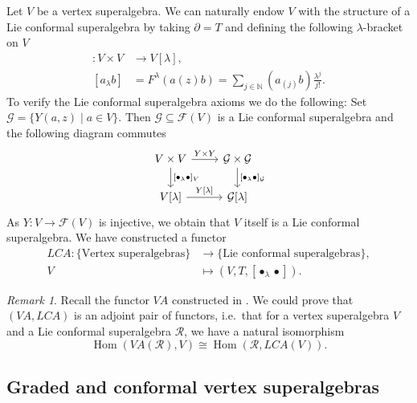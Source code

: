 \documentclass[a4paper, 12pt, reqno]{amsart}
\theoremstyle{remark}
\newtheorem{remark}[theorem]{Remark}
\numberwithin{equation}{subsection}
\DeclareMathOperator{\Hom}{Hom}
\begin{document}
Let $V$ be a vertex superalgebra.
We can naturally endow $V$ with the structure of a Lie conformal superalgebra by taking $\partial = T$ and defining the following $\lambda$-bracket on $V$
\begin{align*}
  [\bullet_{\lambda}\bullet]: V \times V &\to V[\lambda], \\
  [a_{\lambda}b] &= F^{\lambda}(a(z)b) = \sum_{j \in \mathbb{N}}(a_{(j)}b)\frac{\lambda^j}{j!}.
\end{align*}
To verify the Lie conformal superalgebra axioms we do the following:
Set $\mathcal{G}=\{Y(a,z)\mid a \in V\}$.
Then $\mathcal{G}\subseteq \mathcal{F}(V)$ is a Lie conformal superalgebra and the following diagram commutes
\begin{equation*}
  \begin{tikzcd}
    V \times V \arrow[d, "{[\bullet_{\lambda}\bullet]_V}"] \arrow[r, "Y \times Y"] & \mathcal{G} \times \mathcal{G} \arrow[d, "{[\bullet_{\lambda}\bullet]_{\mathcal{G}}}"] \\
    {V[\lambda]} \arrow[r, "{Y[\lambda]}"] & {\mathcal{G}[\lambda]}
  \end{tikzcd}
\end{equation*}
As $Y: V \to \mathcal{F}(V)$ is injective, we obtain that $V$ itself is a Lie conformal superalgebra.
We have constructed a functor
\begin{align*}
  LCA: \{\text{Vertex superalgebras}\} &\to \{\text{Lie conformal superalgebras}\}, \\
  V &\mapsto (V, T, [\bullet_{\lambda}\bullet]).
\end{align*}

\begin{remark}
  \label{rmk:17}
  Recall the functor $VA$ constructed in .
  We could prove that $(VA, LCA)$ is an adjoint pair of functors, i.e.\ that for a vertex superalgebra $V$ and a Lie conformal superalgebra $\mathcal{R}$, we have a natural isomorphism
  \begin{equation*}
    \Hom(VA(\mathcal{R}), V) \cong \Hom(\mathcal{R}, LCA(V)).
  \end{equation*}
\end{remark}

\subsection{Graded and conformal vertex superalgebras}
\label{sec:grad-conf-vert}
\end{document}
